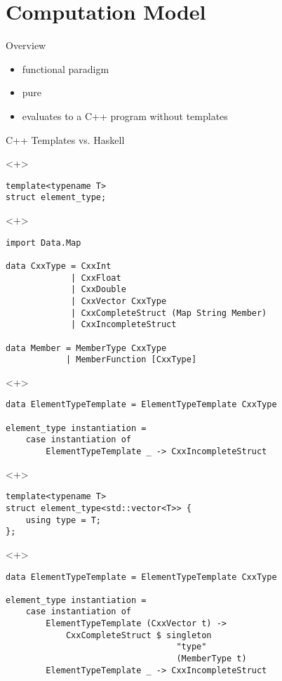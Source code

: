 \documentclass[table]{beamer}
\begin{document}
\section{Computation Model}

\begin{frame}{Overview}
  \begin{itemize}
  \item<+-> functional paradigm
  \item<+-> pure
  \item<+-> evaluates to a C++ program without templates
  \end{itemize}
\end{frame}

\begin{frame}[fragile]{C++ Templates vs. Haskell}
  \begin{onlyenv}<+>
    \begin{verbatim}
template<typename T>
struct element_type;
    \end{verbatim}
  \end{onlyenv}

  \begin{onlyenv}<+>
    \begin{verbatim}
import Data.Map

data CxxType = CxxInt
             | CxxFloat
             | CxxDouble
             | CxxVector CxxType
             | CxxCompleteStruct (Map String Member)
             | CxxIncompleteStruct

data Member = MemberType CxxType
            | MemberFunction [CxxType]
    \end{verbatim}
  \end{onlyenv}

  \begin{onlyenv}<+>
    \begin{verbatim}
data ElementTypeTemplate = ElementTypeTemplate CxxType

element_type instantiation =
    case instantiation of
        ElementTypeTemplate _ -> CxxIncompleteStruct
    \end{verbatim}
  \end{onlyenv}

  \begin{onlyenv}<+>
    \begin{verbatim}
template<typename T>
struct element_type<std::vector<T>> {
    using type = T;
};
    \end{verbatim}
  \end{onlyenv}


    \begin{onlyenv}<+>
    \begin{verbatim}
data ElementTypeTemplate = ElementTypeTemplate CxxType

element_type instantiation =
    case instantiation of
        ElementTypeTemplate (CxxVector t) ->
            CxxCompleteStruct $ singleton
                                  "type"
                                  (MemberType t)
        ElementTypeTemplate _ -> CxxIncompleteStruct
    \end{verbatim}
  \end{onlyenv}
\end{frame}
\end{document}
